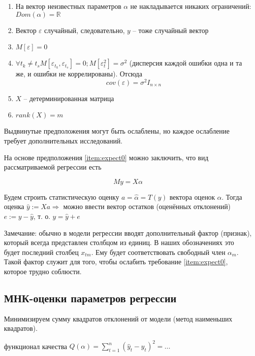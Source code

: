 \documentclass[main.tex]{subfiles}
\begin{document}
\begin{enumerate}[noitemsep]
    \item На вектор неизвестных параметров $ \alpha $ не накладывается никаких ограничений: $ Dom(\alpha) = \mathds{R} $ \label{item:no_limitations}
    \item Вектор $ \varepsilon $ случайный, следовательно, $ y $ -- тоже случайный вектор
    \item $ M [ \varepsilon ] = 0 $ \label{item:expect0}
    \item $ \forall t_k \ne t_s M[\varepsilon_{t_k}, \varepsilon_{t_s}] = 0; M[\varepsilon_t^2] = \sigma^2 $ (дисперсия каждой ошибки одна и та же, и ошибки не коррелированы). Отсюда
    $$ cov(\varepsilon) = \sigma^2 I_{n \times n} $$ \label{item:normal_err}

    \item $ X $ -- детерминированная матрица

    \item $ rank(X) = m $ \label{item:rank}
\end{enumerate}

Выдвинутые предположения могут быть ослаблены, но каждое ослабление требует дополнительных исследований.

На основе предположения \ref{item:expect0} можно заключить, что вид рассматриваемой регрессии есть

$$ My = X \alpha $$

Будем строить статистическую оценку $ a = \hat \alpha = T(y) $ вектора оценок $ \alpha $.
Тогда оценка $ \hat y := Xa \Rightarrow $ можно ввести вектор остатков (оценённых отклонений) $ e := y - \hat y $, т. о. $ y = \hat y + e $

Замечание: обычно в модели регрессии вводят дополнительный фактор (признак), который всегда представлен столбцом из единиц.
В наших обозначениях это будет последний столбец $ x_{tm} $.
Ему будет соответствовать свободный член $ \alpha_m $.
Такой фактор служит для того, чтобы ослабить требование \ref{item:expect0}, которое трудно соблюсти.

\subsection{МНК-оценки параметров регрессии}

Минимизируем сумму квадратов отклонений от модели (метод наименьших квадратов).

функционал качества $ Q(\alpha) = \sum_{t=1}^{n} (\hat y_t - y_t)^2 = ... $
\end{document}
